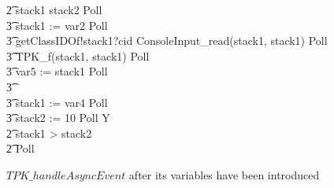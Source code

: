 \begin{figure}[tp!]
\begin{circusaction}
    \t2 \circif stack1 \leq stack2 \circthen Poll \circseq \\
    \t3 stack1 := var2 \circseq Poll \circseq \\
    \t3 getClassIDOf!stack1?cid \then ConsoleInput\_read(stack1, stack1) \circseq Poll \circseq \\
    \t3 TPK\_f(stack1, stack1) \circseq Poll \circseq \\
    \t3 var5 := stack1 \circseq Poll \circseq \\
    \t3 {} \cdots {} \\
    \t3 stack1 := var4 \circseq Poll \circseq \\
    \t3 stack2 := 10 \circseq Poll \circseq Y \\
    \t2 {} \circelse stack1 > stack2 \circthen \Skip \\
    \t2 \circfi \circseq Poll
  \end{circusaction}
  \caption{$TPK\_handleAsyncEvent$ after its variables have been introduced}
  \label{efs-introduce-variables-mid-example-figure}
\end{figure}


